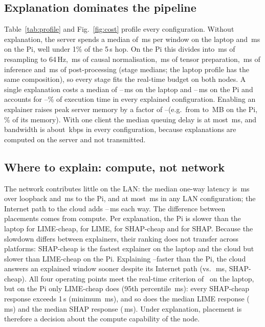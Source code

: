\documentclass[conference]{IEEEtran}
\newcommand{\ms}{\,ms\xspace}
\begin{document}
\subsection{Explanation dominates the pipeline}
\label{sec:res-cost}
Table~\ref{tab:profile} and Fig.~\ref{fig:cost} profile every
configuration. Without explanation,
the server spends a median of \ColocNoneExecMed\ms per window on the
laptop and \FogNoneExecMed\ms on the Pi, well under 1\% of the 5\,s hop.
On the Pi this divides into \FogNoneResamp\ms of resampling to 64\,Hz,
\FogNonePrep\ms of causal normalisation, \FogNoneTensor\ms of tensor
preparation, \FogNoneInf\ms of inference and \FogNonePost\ms of
post-processing (stage medians; the laptop profile has the same
composition), so every stage fits the real-time budget on both nodes. A single
explanation costs a median of \ColocXaiMin--\ColocXaiMax\ms on the laptop
and \FogXaiMin--\FogXaiMax\ms on the Pi and accounts for
\XaiShareMin--\XaiShareMax\% of execution time in every explained
configuration. Enabling an explainer raises peak server memory by a factor
of \RssGrowMin--\RssGrowMax (e.g.\ from \FogNoneRSS to \FogLimeCRSS\,MB on
the Pi, \FogRssPct\% of its memory). With one client the median queuing
delay is at most \QueMaxAll\ms, and bandwidth is about \KbpsAll\,kbps in
every configuration, because explanations are computed on the server and
not transmitted.

\subsection{Where to explain: compute, not network}
\label{sec:res-place}
The network contributes little on the LAN: the median one-way
latency is \ColocNoneLatMed\ms over loopback and \FogNoneLatMed\ms to the
Pi, and at most \LatMaxAll\ms in any LAN configuration; the Internet path
to the cloud adds \CloudNetMin--\CloudNetMax\ms each way. The
difference between placements comes from compute. Per explanation, the Pi
is \FogOverColocXaiLimeC\x slower than the laptop for LIME-cheap,
\FogOverColocXaiLime\x for LIME, \FogOverColocXaiShapC\x for
SHAP-cheap\ifpishapfull{} and \FogOverColocXaiShap\x for SHAP\fi. Because the slowdown differs between explainers, their ranking
does not transfer across platforms: SHAP-cheap is the fastest explainer on
the laptop and the cloud but slower than LIME-cheap on the Pi. Explaining
\FogOverCloudXaiLimeC--\FogOverCloudXaiShapC\x faster than the Pi, the
cloud answers an explained window sooner despite its Internet path
(\CloudShapCRespMed vs.\ \FogShapCRespMed\ms, SHAP-cheap). All four operating points
meet the real-time criterion of~\cite{shats2025} on the laptop, but on the
Pi only LIME-cheap does (95th percentile \FogLimeCRespPNF\ms): every
SHAP-cheap response exceeds 1\,s (minimum \FogShapCRespMin\ms), and so does
the median LIME response (\FogLimeRespMed\ms)\ifpishapfull{} and the
median SHAP response (\FogShapRespMed\ms)\fi. Under explanation, placement is therefore a decision about the compute
capability of the node.
\end{document}
